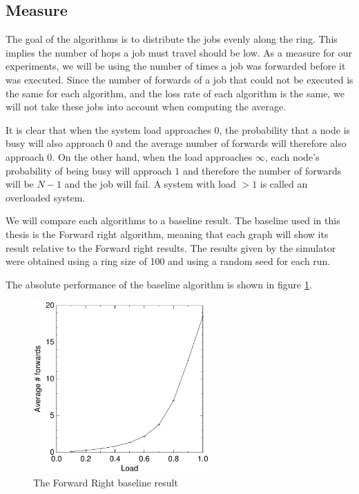 \documentclass[10pt,a4paper]{article}
\begin{document}
\subsection{Measure}
The goal of the algorithms is to distribute the jobs evenly along the ring. This implies the number of hops a job must travel should be low. As a measure for our experiments, we will be using the number of times a job was forwarded before it was executed. Since the number of forwards of a job that could not be executed is the same for each algorithm, and the loss rate of each algorithm is the same, we will not take these jobs into account when computing the average.

It is clear that when the system load approaches $0$, the probability that a node is busy will also approach $0$ and the average number of forwards will therefore also approach $0$. On the other hand, when the load approaches $\infty$, each node's probability of being busy will approach $1$ and therefore the number of forwards will be $N-1$ and the job will fail. A system with load $> 1$ is called an overloaded system.

We will compare each algorithms to a baseline result. The baseline used in this thesis is the Forward right algorithm, meaning that each graph will show its result relative to the Forward right results. The results given by the simulator were obtained using a ring size of 100 and using a random seed for each run.

The absolute performance of the baseline algorithm is shown in figure \ref{baseline}.

\begin{figure}[h!tb]
\centering
\includegraphics[width=0.6\textwidth]{data/right.pdf}
\caption{The Forward Right baseline result}
\label{baseline}
\end{figure}
\end{document}
